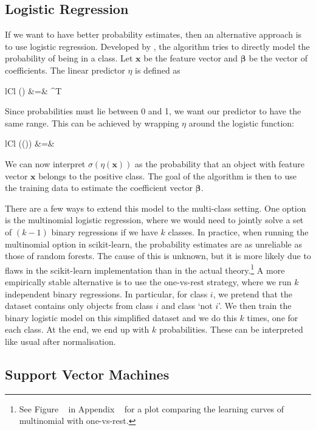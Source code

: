 \subsection{Logistic Regression}

If we want to have better probability estimates, then an alternative approach is to use logistic
regression. Developed by , the algorithm tries to directly model the probability of
being in a class. Let $\bm{x}$ be the feature vector and $\bm{\beta}$ be the vector of coefficients.
The linear predictor $\eta$ is defined as
	\begin{IEEEeqnarray*}{lCl}
		\eta() &=& \bm{\beta}^T 
	\end{IEEEeqnarray*}	
Since probabilities must lie between 0 and 1, we want our predictor to have the same range. This can
be achieved by wrapping $\eta$ around the logistic function:
	\begin{IEEEeqnarray*}{lCl}
		\sigma(\eta()) &=& 
	\end{IEEEeqnarray*}
We can now interpret $\sigma(\eta(\bm{x}))$ as the probability that an object with feature vector
$\bm{x}$ belongs to the positive class. The goal of the algorithm is then to use the training data
to estimate the coefficient vector $\bm{\beta}$.

There are a few ways to extend this model to the multi-class setting. One option is the multinomial
logistic regression, where we would need to jointly solve a set of $(k-1)$ binary regressions if we
have $k$ classes. In practice, when running the multinomial option in scikit-learn, the probability
estimates are as unreliable as those of random forests. The cause of this is unknown, but it is more
likely due to flaws in the scikit-learn implementation than in the actual theory.\footnote{See
	Figure ~ in Appendix ~ for a plot comparing the learning curves of multinomial with one-vs-rest.} A
more empirically stable alternative is to use the one-vs-rest strategy, where we run $k$ independent
binary regressions. In particular, for class $i$, we pretend that the dataset contains only objects
from class $i$ and class `not $i$'. We then train the binary logistic model on this simplified
dataset and we do this $k$ times, one for each class. At the end, we end up with $k$ probabilities.
These can be interpreted like usual after normalisation.


\subsection{Support Vector Machines}

